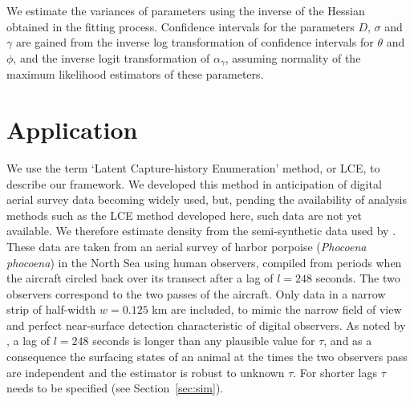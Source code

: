 \documentclass[useAMS, usenatbib, referee]{biom}\usepackage[]{graphicx}\usepackage[]{color}
\begin{document}
We estimate the variances of parameters using the inverse of the Hessian obtained in the fitting process. Confidence intervals for the parameters $D$, $\sigma$ and $\gamma$ are gained from the inverse log transformation of confidence intervals for $\theta$ and $\phi$, and the inverse logit transformation of $\alpha_\gamma$, assuming normality of the maximum likelihood estimators of these parameters.


\section{Application \label{sec:applic}}

We use the term `Latent Capture-history Enumeration' method, or LCE, to describe our framework. We  developed this method in anticipation of digital aerial survey data becoming widely used, but, pending the availability of analysis methods such as the LCE method developed here, such data are not yet available. We therefore estimate density from the semi-synthetic data used by \cite{Stevenson+al:18}. These data are taken from an aerial survey of harbor porpoise ({\em Phocoena phocoena}) in the North Sea using human observers, compiled from periods when the aircraft circled back over its transect after a lag of $l=248$ seconds. The two observers correspond to the two passes of the aircraft. Only data in a narrow strip of half-width $w=0.125$ km are included, to mimic the narrow field of view and perfect near-surface detection characteristic of digital observers. As noted by \cite{Stevenson+al:18}, a lag of $l=248$ seconds is longer than any plausible value for $\tau$, and as a consequence the surfacing states of an animal at the times the two observers pass are independent and the estimator is robust to unknown $\tau$. For shorter lags $\tau$ needs to be specified (see Section~\ref{sec:sim}).

\end{document}
